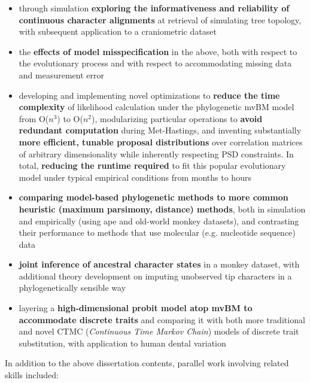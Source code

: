 \documentclass[12pt]{article}
\begin{document}
\begin{itemize}[noitemsep]

\item through simulation \textbf{exploring the informativeness and reliability of continuous character alignments} at retrieval of simulating tree topology, with subsequent application to a craniometric dataset 
\item the \textbf{effects of model misspecification} in the above, both with respect to the evolutionary process and with respect to accommodating missing data and measurement error
\item developing and implementing novel optimizations to \textbf{reduce the time complexity} of likelihood calculation under the phylogenetic mvBM model from O($n^3$) to O($n^2$), modularizing particular operations to \textbf{avoid redundant computation} during Met-Hastings, and inventing substantially \textbf{more efficient, tunable proposal distributions} over correlation matrices of arbitrary dimensionality while inherently respecting PSD constraints. In total, \textbf{reducing the runtime required} to fit this popular evolutionary model under typical empirical conditions from months to hours
\item \textbf{comparing model-based phylogenetic methods to more common heuristic (maximum parsimony, distance) methods}, both in simulation and empirically (using ape and old-world monkey datasets), and contrasting their performance to methods that use molecular (e.g. nucleotide sequence) data
\item \textbf{joint inference of ancestral character states} in a monkey dataset, with additional theory development on imputing unobserved tip characters in a phylogenetically sensible way 
\item layering a \textbf{high-dimensional probit model atop mvBM to accommodate discrete traits} and comparing it with both more traditional and novel CTMC (\emph{Continuous Time Markov Chain}) models of discrete trait substitution, with application to human dental variation

\end{itemize}

In addition to the above dissertation contents, parallel work involving related skills included:
\end{document}
